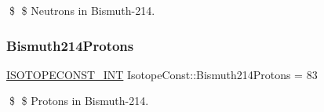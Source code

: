 \$ \$ Neutrons in Bismuth-\/214. \mbox{\label{group___isotope_const-_bismuth-_bi214_gac3795d371c4dcaa27bda6da5009f3c44}} 
\subsubsection{\texorpdfstring{Bismuth214\+Protons}{Bismuth214Protons}}
{\footnotesize\ttfamily \mbox{\hyperlink{group___isotope_const-_macros_ga5f18360b3e99483a35c32d789e62621c}{I\+S\+O\+T\+O\+P\+E\+C\+O\+N\+S\+T\+\_\+\+I\+NT}} Isotope\+Const\+::\+Bismuth214\+Protons = 83}

\$ \$ Protons in Bismuth-\/214. 